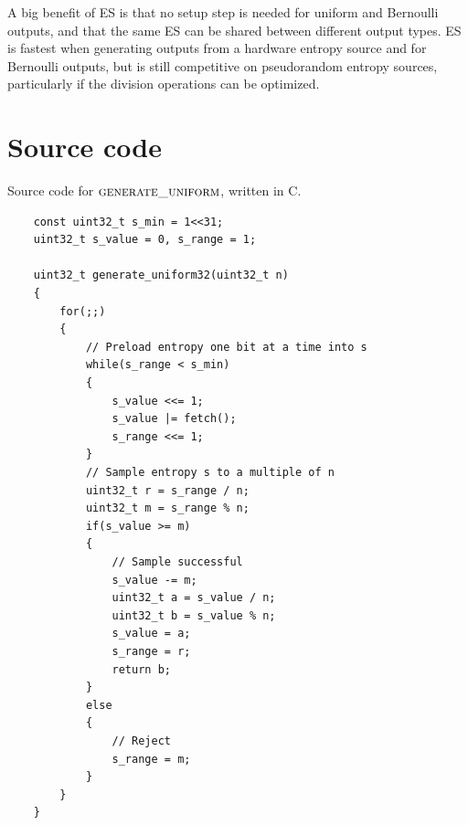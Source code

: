 \documentclass[lettersize,onecolumn]{IEEEtran}
\begin{document}
A big benefit of ES is that no setup step is needed for uniform and Bernoulli outputs, and that the same ES can be shared between different output types. ES is fastest when generating outputs from a hardware entropy source and for Bernoulli outputs, but is still competitive on pseudorandom entropy sources, particularly if the division operations can be optimized.



\printbibliography

\appendix

\section {Source code} \label{app:source-code}

Source code for $\textsc{generate\_uniform}$, written in C.

\begin{verbatim}
    const uint32_t s_min = 1<<31;
    uint32_t s_value = 0, s_range = 1;

    uint32_t generate_uniform32(uint32_t n)
    {
        for(;;)
        {
            // Preload entropy one bit at a time into s
            while(s_range < s_min)
            {
                s_value <<= 1;
                s_value |= fetch();
                s_range <<= 1;
            }
            // Sample entropy s to a multiple of n
            uint32_t r = s_range / n;
            uint32_t m = s_range % n;
            if(s_value >= m)
            {
                // Sample successful
                s_value -= m;
                uint32_t a = s_value / n;
                uint32_t b = s_value % n;
                s_value = a;
                s_range = r; 
                return b;
            }
            else
            {
                // Reject
                s_range = m;
            }
        }
    }
\end{verbatim}
\end{document}
